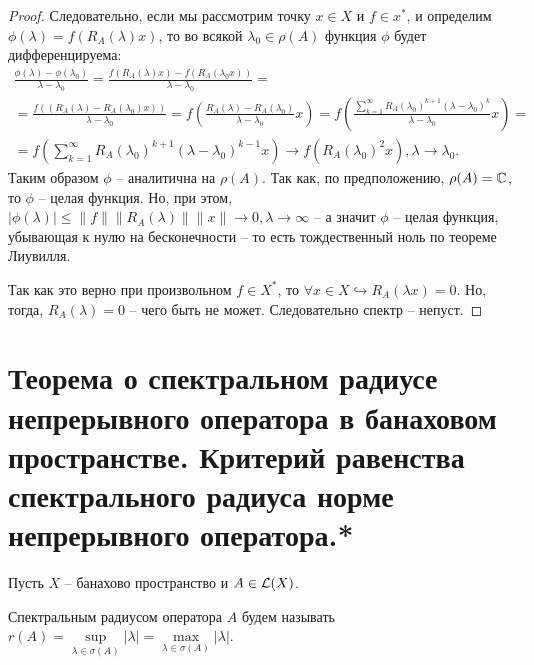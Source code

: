 \begin{proof}
    Следовательно, если мы рассмотрим точку $x \in X$ и $f \in x^*$, и определим $\phi(\lambda) = f(R_A(\lambda)x)$, то во всякой $\lambda_0 \in \rho(A)$ функция $\phi$ будет дифференцируема:
    \begin{multline*}
        \frac{\phi(\lambda) - \phi(\lambda_0)}{\lambda - \lambda_0} = \frac{f(R_A(\lambda)x) - f(R_A(\lambda_0 x))}{\lambda - \lambda_0} = \\ = \frac{f((R_A(\lambda) - R_A(\lambda_0)x))}{\lambda - \lambda_0} = f \left(\frac{R_A(\lambda) - R_A(\lambda_0)}{\lambda - \lambda_0}x\right) = f\left(\frac{\sum_{k = 1}^{\infty} R_A(\lambda_0)^{k + 1}(\lambda - \lambda_0)^k}{\lambda - \lambda_0}x\right) = \\ = f\left(\sum_{k = 1}^{\infty} R_{A}(\lambda_0)^{k + 1}(\lambda - \lambda_0)^{k - 1}x\right) \rightarrow f(R_A(\lambda_0)^2 x), \lambda \rightarrow \lambda_0.
    \end{multline*}
    Таким образом $\phi$ -- аналитична на $\rho(A)$.
    Так как, по предположению, $\rho(A) = \mathbb{C}$, то $\phi$ -- целая функция.
    Но, при этом, $|\phi(\lambda)| \leq \|f\|\|R_A(\lambda)\|\|x\| \rightarrow 0, \lambda \rightarrow \infty$ -- а значит $\phi$ -- целая функция, убывающая к нулю на бесконечности -- то есть тождественный ноль по теореме Лиувилля.

    Так как это верно при произвольном $f \in X^*$, то $\forall x \in X \hookrightarrow R_A(\lambda x) = 0$.
    Но, тогда, $R_A(\lambda) = 0$ -- чего быть не может.
    Следовательно спектр -- непуст.
\end{proof}

\section{Теорема о спектральном радиусе непрерывного оператора в банаховом пространстве. Критерий равенства спектрального радиуса норме непрерывного оператора.*}\label{seq:gelfand}
Пусть $X$ -- банахово пространство и $A \in \mathcal{L}(X)$.
\begin{definition}
    Спектральным радиусом оператора $A$ будем называть $r(A) = \sup\limits_{\lambda \in \sigma(A)}|\lambda| = \max\limits_{\lambda \in \sigma(A)}|\lambda|$.
\end{definition}

